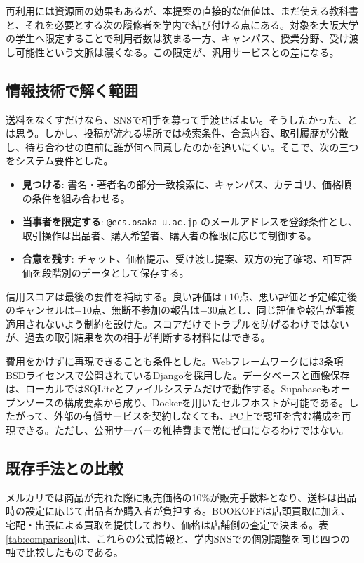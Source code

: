 \documentclass[11pt,a4paper]{jsarticle}
\begin{document}
再利用には資源面の効果もあるが、本提案の直接的な価値は、まだ使える教科書と、それを必要とする次の履修者を学内で結び付ける点にある。対象を大阪大学の学生へ限定することで利用者数は狭まる一方、キャンパス、授業分野、受け渡し可能性という文脈は濃くなる。この限定が、汎用サービスとの差になる。

\subsection{情報技術で解く範囲}
送料をなくすだけなら、SNSで相手を募って手渡せばよい。そうしたかった、とは思う。しかし、投稿が流れる場所では検索条件、合意内容、取引履歴が分散し、待ち合わせの直前に誰が何へ同意したのかを追いにくい。そこで、次の三つをシステム要件とした。
\begin{itemize}
    \item \textbf{見つける}: 書名・著者名の部分一致検索に、キャンパス、カテゴリ、価格順の条件を組み合わせる。
    \item \textbf{当事者を限定する}: \texttt{@ecs.osaka-u.ac.jp} のメールアドレスを登録条件とし、取引操作は出品者、購入希望者、購入者の権限に応じて制御する。
    \item \textbf{合意を残す}: チャット、価格提示、受け渡し提案、双方の完了確認、相互評価を段階別のデータとして保存する。
\end{itemize}

信用スコアは最後の要件を補助する。良い評価は$+10$点、悪い評価と予定確定後のキャンセルは$-10$点、無断不参加の報告は$-30$点とし、同じ評価や報告が重複適用されないよう制約を設けた。スコアだけでトラブルを防げるわけではないが、過去の取引結果を次の相手が判断する材料にはできる。

費用をかけずに再現できることも条件とした。Webフレームワークには3条項BSDライセンスで公開されているDjangoを採用した\cite{django-license}。データベースと画像保存は、ローカルではSQLiteとファイルシステムだけで動作する。Supabaseもオープンソースの構成要素から成り、Dockerを用いたセルフホストが可能である\cite{supabase-selfhost}。したがって、外部の有償サービスを契約しなくても、PC上で認証を含む構成を再現できる。ただし、公開サーバーの維持費まで常にゼロになるわけではない。

\subsection{既存手法との比較}
メルカリでは商品が売れた際に販売価格の10\%が販売手数料となり、送料は出品時の設定に応じて出品者か購入者が負担する\cite{mercari-price,mercari-shipping}。BOOKOFFは店頭買取に加え、宅配・出張による買取を提供しており、価格は店舗側の査定で決まる\cite{bookoff-sell}。表\ref{tab:comparison}は、これらの公式情報と、学内SNSでの個別調整を同じ四つの軸で比較したものである。
\end{document}
